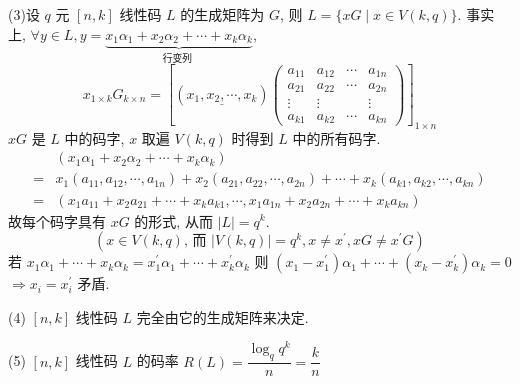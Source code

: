 \begin{remark}
(3)设 $ q $ 元 $ [n, k] $ 线性码 $ L $ 的生成矩阵为 $ G $, 则 $ L=\{x G \mid x \in V(k, q)\} $. 事实上, $ \forall y \in L, y=\underbrace{x_{1} \alpha_{1}+x_{2} \alpha_{2}+\cdots+x_{k} \alpha_{k}}_{\text {行变列 }} $,
$$ x_{1 \times k} G_{k \times n}=\left[\left(\underline{x_{1}, x_{2}, \cdots, x_{k}}\right)\left(\begin{array}{c|ccc}a_{11} & a_{12} & \cdots & a_{1 n} \\ a_{21} & a_{22} & \cdots & a_{2 n} \\ \vdots & \vdots & & \vdots \\ a_{k 1} & a_{k 2} & \cdots & a_{k n}\end{array}\right)\right]_{1 \times n} $$ 
$ x G $ 是 $ L $ 中的码字, $ x $ 取遍 $ V(k, q) $ 时得到 $ L $ 中的所有码字.
$$
\begin{aligned}
& \left(x_{1} \alpha_{1}+x_{2} \alpha_{2}+\cdots+x_{k} \alpha_{k}\right) \\
= & x_{1}\left(a_{11}, a_{12}, \cdots, a_{1 n}\right)+x_{2}\left(a_{21}, a_{22}, \cdots, a_{2 n}\right)+\cdots  +x_{k}\left(a_{k 1}, a_{k 2}, \cdots, a_{k n}\right) \\
= & \left(x_{1} a_{11}+x_{2} a_{21}+\cdots+x_{k} a_{k 1}, \cdots, x_{1} a_{1 n}+x_{2} a_{2 n}+\cdots+x_{k} a_{k n}\right)
\end{aligned}
$$
故每个码字具有 $ x G $ 的形式, 从而 $ |L|=q^{k} $.
$$
\left(x \in V(k, q) \text {, 而 }|V(k, q)|=q^{k}, x \neq x^{\prime}, x G \neq x^{\prime} G\right)
$$
若 $ x_{1} \alpha_{1}+\cdots+x_{k} \alpha_{k}=x_{1}^{\prime} \alpha_{1}+\cdots+x_{k}^{\prime} \alpha_{k} $
则 $ \left(x_{1}-x_{1}^{\prime}\right) \alpha_{1}+\cdots+\left(x_{k}-x_{k}^{\prime}\right) \alpha_{k}=0 $
$ \Rightarrow x_{i}=x_{i}^{\prime} $ 矛盾.

(4) $ [n, k] $ 线性码 $ L $ 完全由它的生成矩阵来决定.

(5) $ [n, k] $ 线性码 $ L $ 的码率 $ R(L)=\dfrac{\log _{q} q^{k}}{n}=\dfrac{k}{n} $
\end{remark}

